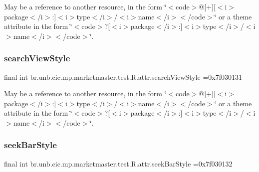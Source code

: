 May be a reference to another resource, in the form \char`\"{}$<$code$>$@\mbox{[}+\mbox{]}\mbox{[}$<$i$>$package$<$/i$>$\+:\mbox{]}$<$i$>$type$<$/i$>$/$<$i$>$name$<$/i$>$$<$/code$>$\char`\"{} or a theme attribute in the form \char`\"{}$<$code$>$?\mbox{[}$<$i$>$package$<$/i$>$\+:\mbox{]}$<$i$>$type$<$/i$>$/$<$i$>$name$<$/i$>$$<$/code$>$\char`\"{}. \mbox{\label{classbr_1_1unb_1_1cic_1_1mp_1_1marketmaster_1_1test_1_1R_1_1attr_ac33de6b6a1f21faeeff9342777e0b012}} 
\subsubsection{\texorpdfstring{search\+View\+Style}{searchViewStyle}}
{\footnotesize\ttfamily final int br.\+unb.\+cic.\+mp.\+marketmaster.\+test.\+R.\+attr.\+search\+View\+Style =0x7f030131\hspace{0.3cm}{\ttfamily [static]}}

May be a reference to another resource, in the form \char`\"{}$<$code$>$@\mbox{[}+\mbox{]}\mbox{[}$<$i$>$package$<$/i$>$\+:\mbox{]}$<$i$>$type$<$/i$>$/$<$i$>$name$<$/i$>$$<$/code$>$\char`\"{} or a theme attribute in the form \char`\"{}$<$code$>$?\mbox{[}$<$i$>$package$<$/i$>$\+:\mbox{]}$<$i$>$type$<$/i$>$/$<$i$>$name$<$/i$>$$<$/code$>$\char`\"{}. \mbox{\label{classbr_1_1unb_1_1cic_1_1mp_1_1marketmaster_1_1test_1_1R_1_1attr_a4ecbeabcbe03e9a4970eeb7e086f11e5}} 
\subsubsection{\texorpdfstring{seek\+Bar\+Style}{seekBarStyle}}
{\footnotesize\ttfamily final int br.\+unb.\+cic.\+mp.\+marketmaster.\+test.\+R.\+attr.\+seek\+Bar\+Style =0x7f030132\hspace{0.3cm}{\ttfamily [static]}}

